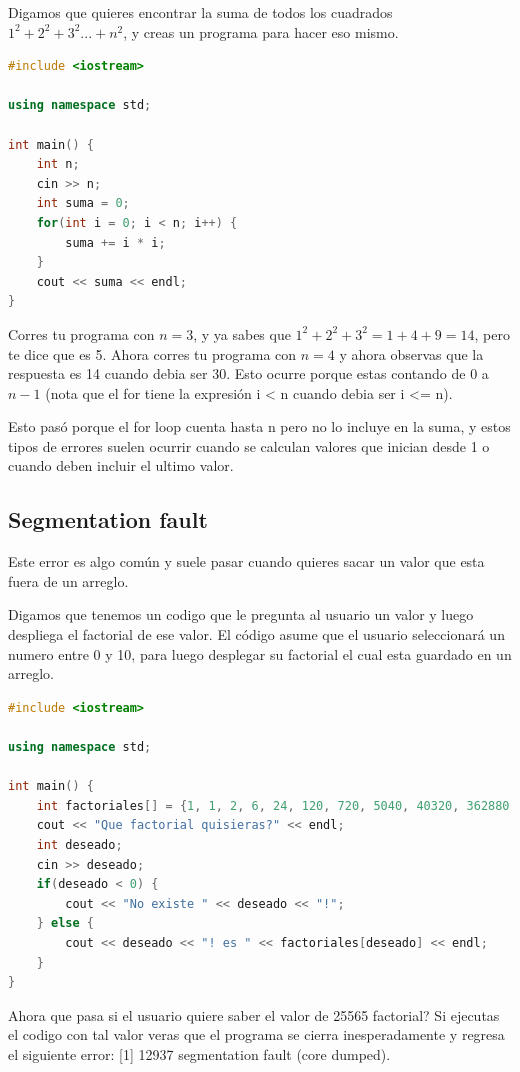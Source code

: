\documentclass{article}
\begin{document}
Digamos que quieres encontrar la suma de todos los cuadrados $1^2 + 2^2 + 3^2 ... + n^2$, y creas un programa para hacer eso mismo.

\begin{lstlisting}[language=C++, caption=Error por uno]
#include <iostream>

using namespace std;

int main() {
    int n;
    cin >> n;
    int suma = 0;
    for(int i = 0; i < n; i++) {
        suma += i * i;
    }
    cout << suma << endl;
}
\end{lstlisting}

Corres tu programa con $n = 3$, y ya sabes que $1^2 + 2^2 + 3^2 = 1 + 4 + 9 = 14$, pero te dice que es 5. Ahora corres tu programa con $n = 4$ y ahora observas que la respuesta es 14 cuando debia ser 30. Esto ocurre porque estas contando de $0$ a $n-1$ (nota que el for tiene la expresión i < n cuando debia ser i <= n).

Esto pasó porque el for loop cuenta hasta n pero no lo incluye en la suma, y estos tipos de errores suelen ocurrir cuando se calculan valores que inician desde 1 o cuando deben incluir el ultimo valor.

\subsection{Segmentation fault}
Este error es algo común y suele pasar cuando quieres sacar un valor que esta fuera de un arreglo.

Digamos que tenemos un codigo que le pregunta al usuario un valor y luego despliega el factorial de ese valor. El código asume que el usuario seleccionará un numero entre 0 y 10, para luego desplegar su factorial el cual esta guardado en un arreglo.

\begin{lstlisting}[language=C++, caption=Error de inicialización]
#include <iostream>

using namespace std;

int main() {
    int factoriales[] = {1, 1, 2, 6, 24, 120, 720, 5040, 40320, 362880, 3628800};
    cout << "Que factorial quisieras?" << endl;
    int deseado;
    cin >> deseado;
    if(deseado < 0) {
        cout << "No existe " << deseado << "!";
    } else {
        cout << deseado << "! es " << factoriales[deseado] << endl;
    }
}
\end{lstlisting}

Ahora que pasa si el usuario quiere saber el valor de 25565 factorial? Si ejecutas el codigo con tal valor veras que el programa se cierra inesperadamente y regresa el siguiente error: [1] 12937 segmentation fault (core dumped).
\end{document}

